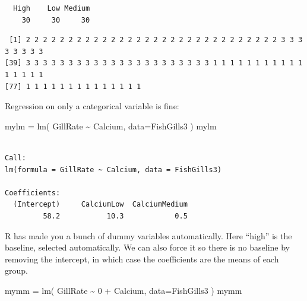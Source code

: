 \documentclass[
  letterpaper,
  DIV=11,
  numbers=noendperiod]{scrreprt}
\newenvironment{Shaded}{\begin{snugshade}}{\end{snugshade}}
\newcommand{\AttributeTok}[1]{\textcolor[rgb]{0.49,0.56,0.16}{#1}}
\newcommand{\DecValTok}[1]{\textcolor[rgb]{0.25,0.63,0.44}{#1}}
\newcommand{\FunctionTok}[1]{\textcolor[rgb]{0.02,0.16,0.49}{#1}}
\newcommand{\NormalTok}[1]{\textcolor[rgb]{0.00,0.44,0.13}{#1}}
\newcommand{\OtherTok}[1]{\textcolor[rgb]{0.00,0.44,0.13}{#1}}
\newcommand{\SpecialCharTok}[1]{\textcolor[rgb]{0.25,0.44,0.63}{#1}}
\begin{document}
\begin{verbatim}
  High    Low Medium 
    30     30     30 
\end{verbatim}

\begin{Shaded}
\end{Shaded}

\begin{verbatim}
 [1] 2 2 2 2 2 2 2 2 2 2 2 2 2 2 2 2 2 2 2 2 2 2 2 2 2 2 2 2 2 2 3 3 3 3 3 3 3 3
[39] 3 3 3 3 3 3 3 3 3 3 3 3 3 3 3 3 3 3 3 3 3 3 1 1 1 1 1 1 1 1 1 1 1 1 1 1 1 1
[77] 1 1 1 1 1 1 1 1 1 1 1 1 1 1
\end{verbatim}

Regression on only a categorical variable is fine:

\begin{Shaded}
\begin{Highlighting}[]
\NormalTok{mylm }\OtherTok{=} \FunctionTok{lm}\NormalTok{( GillRate }\SpecialCharTok{\textasciitilde{}}\NormalTok{ Calcium, }\AttributeTok{data=}\NormalTok{FishGills3 )}
\NormalTok{mylm}
\end{Highlighting}
\end{Shaded}

\begin{verbatim}

Call:
lm(formula = GillRate ~ Calcium, data = FishGills3)

Coefficients:
  (Intercept)     CalciumLow  CalciumMedium  
         58.2           10.3            0.5  
\end{verbatim}

R has made you a bunch of dummy variables automatically. Here ``high''
is the baseline, selected automatically. We can also force it so there
is no baseline by removing the intercept, in which case the coefficients
are the means of each group.

\begin{Shaded}
\begin{Highlighting}[]
\NormalTok{mymm }\OtherTok{=} \FunctionTok{lm}\NormalTok{( GillRate }\SpecialCharTok{\textasciitilde{}} \DecValTok{0} \SpecialCharTok{+}\NormalTok{ Calcium, }\AttributeTok{data=}\NormalTok{FishGills3 )}
\NormalTok{mymm}
\end{Highlighting}
\end{Shaded}
\end{document}
